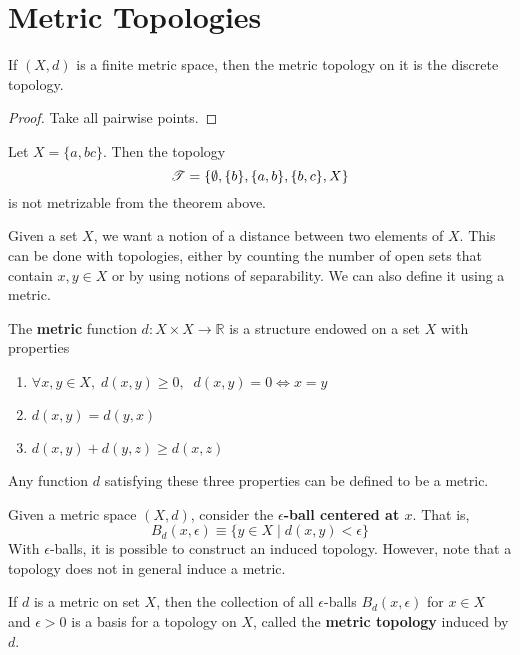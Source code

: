 \section{Metric Topologies}

  \begin{theorem}
    If $(X, d)$ is a finite metric space, then the metric topology on it is the discrete topology. 
  \end{theorem}
  \begin{proof}
    Take all pairwise points. 
  \end{proof}

  \begin{example}
    Let $X = \{a, b c\}$. Then the topology 
    \begin{equation}
      \operatorname{\mathscr{T}} = \{\emptyset, \{b\}, \{a, b\}, \{b, c\}, X \}
    \end{equation} 
    is not metrizable from the theorem above. 
  \end{example}


  Given a set $X$, we want a notion of a distance between two elements of $X$. This can be done with topologies, either by counting the number of open sets that contain $x, y \in X$ or by using notions of separability. We can also define it using a metric. 

  \begin{definition}
  The \textbf{metric} function $d: X \times X \longrightarrow \mathbb{R}$ is a structure endowed on a set $X$ with properties 
  \begin{enumerate}
      \item $\forall x, y \in X, \; d(x, y) \geq 0, \; \; d(x, y) = 0 \iff x = y$
      \item $d(x, y) = d(y, x)$ 
      \item $d(x, y) + d(y, z) \geq d(x, z)$
  \end{enumerate}
  Any function $d$ satisfying these three properties can be defined to be a metric. 
  \end{definition}

  Given a metric space $(X, d)$, consider the \textbf{$\epsilon$-ball centered at $x$}. That is, 
  \[B_d (x, \epsilon) \equiv \{y \in X \; | \; d(x, y) < \epsilon\}\]
  With $\epsilon$-balls, it is possible to construct an induced topology. However, note that a topology does not in general induce a metric. 

  \begin{definition}
  If $d$ is a metric on set $X$, then the collection of all $\epsilon$-balls $B_d (x, \epsilon)$ for $x \in X$ and $\epsilon > 0$ is a basis for a topology on $X$, called the \textbf{metric topology} induced by $d$. 
  \end{definition}

